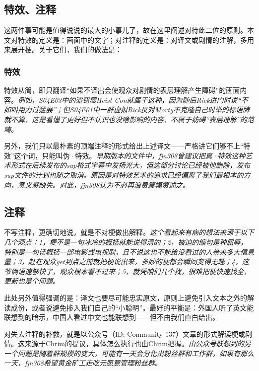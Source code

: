 \documentclass{ctexart}
\begin{document}
\subsection{特效、注释}

这两件事可能是值得说说的最大的小事儿了，故在这里阐述对待此二位的原则。本文对特效的定义是：画面中的文字；对注释的定义是：对译文或剧情的注解，多用来展开梗。关于它们，我们的做法是：

\subsubsection{特效}

特效从简，即只翻译“如果不译出会使观众对剧情的表层理解产生障碍”的画面内容。\emph{\small 例如，S04E03中的盗窃展Heist Con就属于这种，因为随后Rick进门时说“不如叫用力过猛展”；但S04E01中一群虚拟Rick反对Morty不克隆自己时举的标语牌就不算，这是看懂了更好但不认识也没啥影响的内容，不属于妨碍“表层理解”的范畴。}

另外，我们只以最朴素的顶端注释的形式给出上述译文——严格讲它们够不上“特效”这个词，只能叫伪·特效。\emph{\small 早期版本的文件中，fjn308曾建议把真·特效这种艺术形式在后续发布的sup格式字幕中发扬光大，但这部分讨论已经被他删除，发布sup文件的计划也随之取消。原因是对特效艺术的追求已经偏离了我们最根本的方向，意义感缺失。对此，fjn308认为不必再浪费篇幅赘述之。}

\subsection{注释}

不写注释，更确切地说，就是不对梗做出解释。\emph{\small 这个看起来有病的想法来源于以下几个观点：1，梗不是一句冰冷的概括就能说得清的；2，被迫的缩句是种屈辱，特别是一句话概括一部电影或电视剧，且不说这也不能给没看过的人带来多大信息量；3，赶在观众get到点之前就把梗说出来，多妙的梗都会瞬间变得无趣；4，这爷俩语速够快了，观众根本看不过来；5，就凭咱们几个找，很难把梗快速找全，更新也是个问题。}

{\color{red} 此处另外值得强调的是：译文也要尽可能忠实原文，原则上避免引入文本之外的解读成份，或者说避免掺入我们自己的“小聪明”。最好的平衡是：外国人听了英文能联想到的暗示，中国人看过中文也能联想到——但不由我们直白给出。}

对失去注释的补救，就是以公众号（ID: Community-137）文章的形式解读梗或剧情。这来源于Chrim的提议，具体怎么执行也由Chrim把握。\emph{\small 由公众号联想到的另一个问题是随着群规模的变大，可能有一天会分化出粉丝群和工作群，如果有那么一天，fjn308希望黄金矿工走吃元愿意管理粉丝群。}
\end{document}
